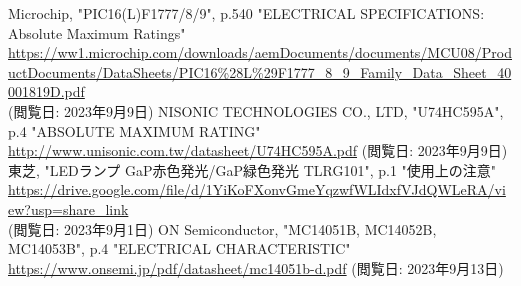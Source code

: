 \documentclass[a4paper]{ltjsarticle}
\begin{document}
\begin{thebibliography}{200}
  Microchip, "PIC16(L)F1777/8/9", p.540 "ELECTRICAL SPECIFICATIONS: Absolute Maximum Ratings" \\ \url{https://ww1.microchip.com/downloads/aemDocuments/documents/MCU08/ProductDocuments/DataSheets/PIC16%28L%29F1777_8_9_Family_Data_Sheet_40001819D.pdf} \\ (閲覧日: 2023年9月9日)
  NISONIC TECHNOLOGIES CO., LTD, "U74HC595A", p.4 "ABSOLUTE MAXIMUM RATING"  \\ \url{http://www.unisonic.com.tw/datasheet/U74HC595A.pdf} (閲覧日: 2023年9月9日)
  東芝, "LEDランプ GaP赤色発光/GaP緑色発光 TLRG101", p.1 "使用上の注意" \\ \url{https://drive.google.com/file/d/1YiKoFXonvGmeYqzwfWLIdxfVJdQWLeRA/view?usp=share_link} \\ (閲覧日: 2023年9月1日)
  ON Semiconductor, "MC14051B, MC14052B, MC14053B", p.4 "ELECTRICAL CHARACTERISTIC" \\ \url{https://www.onsemi.jp/pdf/datasheet/mc14051b-d.pdf} (閲覧日: 2023年9月13日)
\end{thebibliography}

\end{document}

